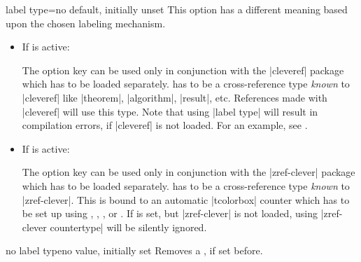 \begin{docTcbKey}[][doc updated=2023-02-09]{label type}{=}{no default, initially unset}
This option has a different meaning based upon the chosen labeling mechanism.
\begin{itemize}
\item If  is active:\par
  The option key  can be used only in conjunction with the |cleveref| package
  \cite{cubitt:2018a} which has to be loaded separately.
   has to be a cross-reference type \emph{known} to |cleveref|
  like |theorem|, |algorithm|, |result|, etc. References made with |cleveref|
  will use this type. Note that using |label type| will result in compilation
  errors, if |cleveref| is not loaded.
  For an example, see .
\item If  is active:\par
  The option key  can be used only in conjunction with the |zref-clever| package
  \cite{barros:zref-clever}
  which has to be loaded separately.
   has to be a cross-reference type \emph{known} to |zref-clever|.
  This  is bound to an automatic |tcolorbox| counter which has to be set up using
  ,
  ,
  , or
  .
  If  is set, but |zref-clever| is not loaded,
  using |zref-clever countertype| will be silently ignored.
\end{itemize}
\end{docTcbKey}


\begin{docTcbKey}[][doc updated=2023-02-09]{no label type}{}{no value, initially set}
Removes a , if set before.
\end{docTcbKey}



